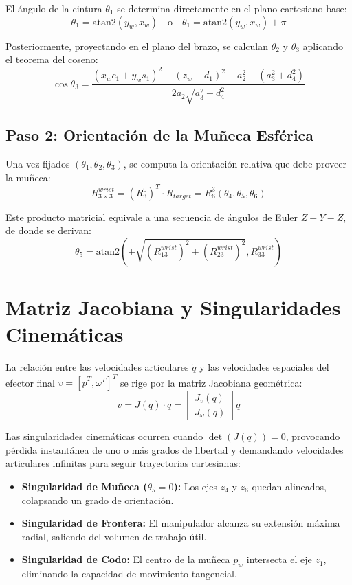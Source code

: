 \documentclass[11pt,a4paper]{article}
\begin{document}
El ángulo de la cintura $\theta_1$ se determina directamente en el plano cartesiano base:
\begin{equation}
\theta_1 = \text{atan2}(y_w, x_w) \quad \text{o} \quad \theta_1 = \text{atan2}(y_w, x_w) + \pi
\end{equation}

Posteriormente, proyectando en el plano del brazo, se calculan $\theta_2$ y $\theta_3$ aplicando el teorema del coseno:
\begin{equation}
\cos\theta_3 = \frac{(x_w c_1 + y_w s_1)^2 + (z_w - d_1)^2 - a_2^2 - (a_3^2 + d_4^2)}{2 a_2 \sqrt{a_3^2 + d_4^2}}
\end{equation}

\subsection{Paso 2: Orientación de la Muñeca Esférica}
Una vez fijados $(\theta_1, \theta_2, \theta_3)$, se computa la orientación relativa que debe proveer la muñeca:
\begin{equation}
R_{3\times3}^{wrist} = (R_3^0)^T \cdot R_{target} = R_6^3(\theta_4, \theta_5, \theta_6)
\end{equation}

Este producto matricial equivale a una secuencia de ángulos de Euler $Z-Y-Z$, de donde se derivan:
\begin{equation}
\theta_5 = \text{atan2}\left(\pm\sqrt{(R_{13}^{wrist})^2 + (R_{23}^{wrist})^2}, R_{33}^{wrist}\right)
\end{equation}

\section{Matriz Jacobiana y Singularidades Cinemáticas}
La relación entre las velocidades articulares $\dot{q}$ y las velocidades espaciales del efector final $v = [\dot{p}^T, \omega^T]^T$ se rige por la matriz Jacobiana geométrica:
\begin{equation}
v = J(q) \cdot \dot{q} = \begin{bmatrix} J_v(q) \\ J_\omega(q) \end{bmatrix} \dot{q}
\end{equation}

Las singularidades cinemáticas ocurren cuando $\det(J(q)) = 0$, provocando pérdida instantánea de uno o más grados de libertad y demandando velocidades articulares infinitas para seguir trayectorias cartesianas:
\begin{itemize}
    \item \textbf{Singularidad de Muñeca ($\theta_5 = 0$):} Los ejes $z_4$ y $z_6$ quedan alineados, colapsando un grado de orientación.
    \item \textbf{Singularidad de Frontera:} El manipulador alcanza su extensión máxima radial, saliendo del volumen de trabajo útil.
    \item \textbf{Singularidad de Codo:} El centro de la muñeca $p_w$ intersecta el eje $z_1$, eliminando la capacidad de movimiento tangencial.
\end{itemize}
\end{document}
